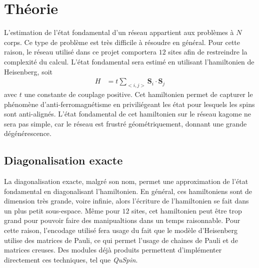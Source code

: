 \documentclass[../main.tex]{subfiles}
\begin{document}
  \section{Théorie}
  L'estimation de l'état fondamental d'un réseau appartient aux problèmes à $N$
  corps. Ce type de problème est très difficile à résoudre en général. Pour cette
  raison, le réseau utilisé dans ce projet comportera $12$ sites afin de
  restreindre la complexité du calcul. L'état fondamental sera estimé en utilisant
  l'hamiltonien de Heisenberg, soit
  \begin{align}
      H&=t\sum_{<i,j>}\mathbf{S}_i\cdot\mathbf{S}_j
  \end{align}
  avec $t$ une constante de couplage positive. Cet hamiltonien permet de capturer
  le phénomène d'anti-ferromagnétisme en priviliégeant les état pour lesquels
  les spins sont anti-alignés. L'état fondamental de cet hamiltonien sur le réseau
  kagome ne sera pas simple, car le réseau est frustré géométriquement, donnant
  une grande dégénérescence.
  \subsection{Diagonalisation exacte} %
  \label{sub:Diagonalisation exacte}
    La diagonalisation exacte, malgré son nom, permet une approximation de l'état
    fondamental en diagonalisant l'hamiltonien. En général, ces hamiltoniens
    sont de dimension très grande, voire infinie, alors l'écriture de
    l'hamiltonien se fait dans un plus petit sous-espace. Même pour $12$ sites,
    cet hamiltonien peut être trop grand pour pouvoir faire des manipualtions
    dans un temps raisonnable. Pour cette raison, l'encodage utilisé fera usage
    du fait que le modèle d'Heisenberg utilise des matrices de Pauli, ce qui
    permet l'usage de chaines de Pauli et de matrices creuses. Des modules déjà
    produits permettent d'implémenter directement ces techniques, tel que
    \textit{QuSpin}.

\end{document}
